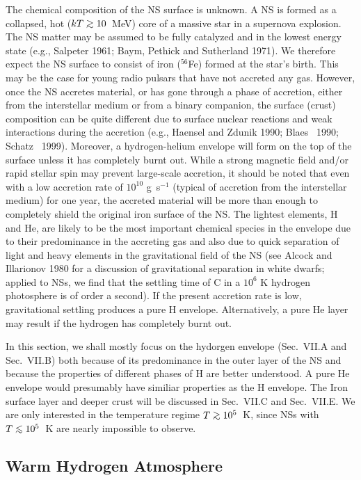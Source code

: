 The chemical composition of the NS surface is unknown. 
A NS is formed as a collapsed, hot ($kT\go 10$~MeV) core
of a massive star in a supernova explosion. The NS matter
may be assumed to be fully catalyzed and in the lowest energy 
state (e.g., Salpeter 1961; Baym, Pethick and Sutherland 1971).  
We therefore expect the NS surface to consist
of iron ($^{56}$Fe) formed at the star's birth.
This may be the case for young radio pulsars that have not accreted any gas.
However, once the NS accretes material, or has gone through a phase
of accretion, either from the interstellar medium or from a binary companion, 
the surface (crust) composition can be quite different due to surface 
nuclear reactions and weak interactions during the accretion (e.g., Haensel and
Zdunik 1990; Blaes \etal~1990; Schatz \etal~1999). Moreover,
a hydrogen-helium envelope will form on the top of the surface unless it has 
completely burnt out. While a strong magnetic field and/or rapid stellar 
spin may prevent large-scale accretion, 
it should be noted that even with a low accretion rate 
of $10^{10}$ g~s$^{-1}$ (typical of accretion from the interstellar
medium) for one year, the accreted material will be more 
than enough to completely shield the original iron surface of the NS.
The lightest elements, H and He, are likely to be the 
most important chemical species in the envelope due to their 
predominance in the accreting gas and also due to quick 
separation of light and heavy elements in the gravitational field 
of the NS (see Alcock and Illarionov 1980 for a discussion 
of gravitational separation in white dwarfs; applied to NSs, we find
that the settling time of C in a $10^6$ K hydrogen 
photosphere is of order a second). If the present accretion rate is low, 
gravitational settling produces a pure H envelope. Alternatively, a
pure He layer may result if the hydrogen has completely burnt out. 

In this section, we shall mostly focus on the hydorgen envelope 
(Sec.~VII.A and Sec.~VII.B) both because of its predominance in the 
outer layer of the NS and because the properties of different phases of 
H are better understood. A pure He envelope would presumably have similiar
properties as the H envelope. The Iron surface layer and deeper crust will be 
discussed in Sec.~VII.C and Sec.~VII.E. We are only interested in the 
temperature regime $T\go 10^5$~K, since NSs with 
$T\lo 10^5$~K are nearly impossible to observe.

\subsection{Warm Hydrogen Atmosphere}

